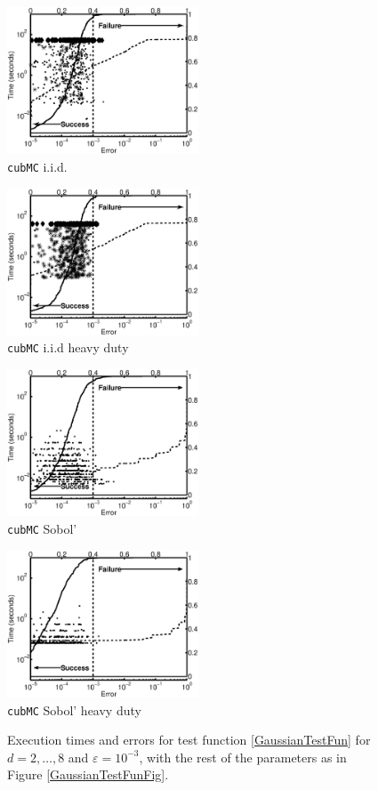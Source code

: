 \documentclass[graybox]{svmult}
\begin{document}
\begin{figure}
\centering
\begin{minipage}{5.7cm} \centering \includegraphics[width=5.7cm]{gaussiand=7iidErrTime.eps} \\ {\tt cubMC} i.i.d. \end{minipage}
\begin{minipage}{5.7cm} \centering \includegraphics[width=5.7cm]{gaussiand=7iidheavyErrTime.eps} \\ {\tt cubMC} i.i.d heavy duty \end{minipage}
\begin{minipage}{5.7cm} \centering \includegraphics[width=5.7cm]{gaussiand=7SobolErrTime.eps} \\ {\tt cubMC} Sobol' \end{minipage}
\begin{minipage}{5.7cm} \centering \includegraphics[width=5.7cm]{gaussiand=7SobolheavyErrTime.eps} \\ {\tt cubMC} Sobol' heavy duty \end{minipage}
\caption{Execution times and errors for test function \eqref{GaussianTestFun} for $d=2, \ldots, 8$ and $\varepsilon=10^{-3}$, with the rest of the parameters as in Figure \ref{GaussianTestFunFig}.\label{GaussianTestFunHDFig}}
\end{figure}
\end{document}
